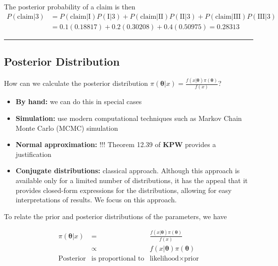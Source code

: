 \documentclass[]{book}
\providecommand{\tightlist}{%
  \setlength{\itemsep}{0pt}\setlength{\parskip}{0pt}}
\theoremstyle{definition}
\theoremstyle{definition}
\theoremstyle{definition}
\theoremstyle{remark}
\begin{document}
The posterior probability of a claim is then \[\begin{aligned} 
P(\text{claim} | 3) &= P(\text{claim}|\text{I})P(\text{I} | 3) + P(\text{claim} | \text{II})P(\text{II} | 3) + P(\text{claim} | \text{III}) P(\text{III} | 3) \\ 
&= 0.1(0.18817) + 0.2(0.30208) + 0.4(0.50975) = 0.28313
\end{aligned}\]

\begin{center}\rule{0.5\linewidth}{\linethickness}\end{center}

\subsection{Posterior Distribution}\label{posterior-distribution}

How can we calculate the posterior distribution
\(\pi(\boldsymbol \theta | x) =\frac{f(x|\boldsymbol \theta )\pi(\boldsymbol \theta)}{f(x)}\)?

\begin{itemize}
\tightlist
\item
  \textbf{By hand:} we can do this in special cases
\item
  \textbf{Simulation:} use modern computational techniques such as
  Markov Chain Monte Carlo (MCMC) simulation
\item
  \textbf{Normal approximation:} !!! Theorem 12.39 of \textbf{KPW}
  provides a justification
\item
  \textbf{Conjugate distributions:} classical approach. Although this
  approach is available only for a limited number of distributions, it
  has the appeal that it provides closed-form expressions for the
  distributions, allowing for easy interpretations of results. We focus
  on this approach.
\end{itemize}

To relate the prior and posterior distributions of the parameters, we
have

\[\begin{array}{ccc}
\pi(\boldsymbol \theta | x) & = & \frac{f(x|\boldsymbol \theta )\pi(\boldsymbol \theta)}{f(x)}  \\
 & \propto  & f(x|\boldsymbol \theta ) \pi(\boldsymbol \theta) \\
\text{Posterior} & \text{is proportional to} & \text{likelihood} \times \text{prior} \\
\end{array}\]
\end{document}
